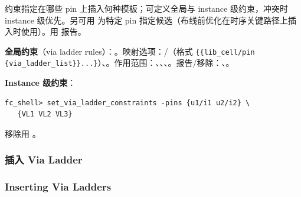 约束指定在哪些 pin 上插入何种模板；可定义全局与 instance 级约束，冲突时 instance 级优先。另可用  为特定 pin 指定候选（布线前优化在时序关键路径上插入时使用）。用  报告。

\textbf{全局约束}（via ladder rules）：。映射选项：/（格式 \texttt{\{\{lib\_cell/pin \{via\_ladder\_list\}\}...\}}）、。作用范围：、、、。报告/移除：、。

\textbf{Instance 级约束}：
\begin{lstlisting}
fc_shell> set_via_ladder_constraints -pins {u1/i1 u2/i2} \
   {VL1 VL2 VL3}
\end{lstlisting}
移除用 。

\subsubsection{插入 Via Ladder}
\subsubsection*{Inserting Via Ladders}


